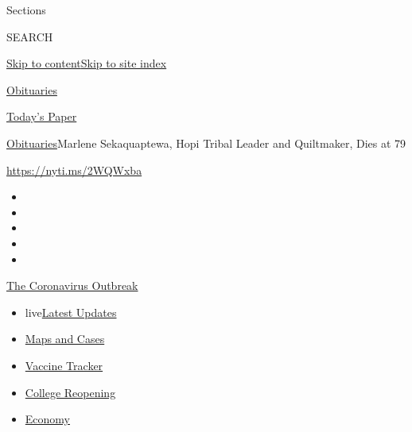 Sections

SEARCH

\protect\hyperlink{site-content}{Skip to
content}\protect\hyperlink{site-index}{Skip to site index}

\href{https://www.nytimes3xbfgragh.onion/section/obituaries}{Obituaries}

\href{https://myaccount.nytimes3xbfgragh.onion/auth/login?response_type=cookie\&client_id=vi}{}

\href{https://www.nytimes3xbfgragh.onion/section/todayspaper}{Today's
Paper}

\href{/section/obituaries}{Obituaries}\textbar{}Marlene Sekaquaptewa,
Hopi Tribal Leader and Quiltmaker, Dies at 79

\url{https://nyti.ms/2WQWxba}

\begin{itemize}
\item
\item
\item
\item
\item
\end{itemize}

\href{https://www.nytimes3xbfgragh.onion/news-event/coronavirus?action=click\&pgtype=Article\&state=default\&region=TOP_BANNER\&context=storylines_menu}{The
Coronavirus Outbreak}

\begin{itemize}
\tightlist
\item
  live\href{https://www.nytimes3xbfgragh.onion/2020/08/04/world/coronavirus-covid-19.html?action=click\&pgtype=Article\&state=default\&region=TOP_BANNER\&context=storylines_menu}{Latest
  Updates}
\item
  \href{https://www.nytimes3xbfgragh.onion/interactive/2020/us/coronavirus-us-cases.html?action=click\&pgtype=Article\&state=default\&region=TOP_BANNER\&context=storylines_menu}{Maps
  and Cases}
\item
  \href{https://www.nytimes3xbfgragh.onion/interactive/2020/science/coronavirus-vaccine-tracker.html?action=click\&pgtype=Article\&state=default\&region=TOP_BANNER\&context=storylines_menu}{Vaccine
  Tracker}
\item
  \href{https://www.nytimes3xbfgragh.onion/2020/08/02/us/covid-college-reopening.html?action=click\&pgtype=Article\&state=default\&region=TOP_BANNER\&context=storylines_menu}{College
  Reopening}
\item
  \href{https://www.nytimes3xbfgragh.onion/live/2020/08/03/business/stock-market-today-coronavirus?action=click\&pgtype=Article\&state=default\&region=TOP_BANNER\&context=storylines_menu}{Economy}
\end{itemize}


